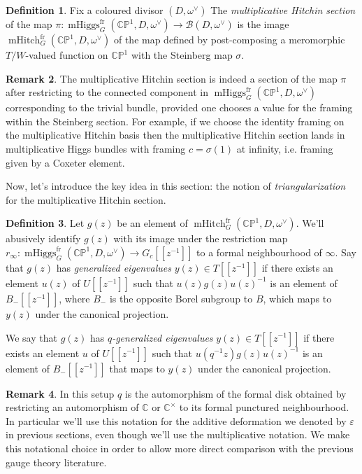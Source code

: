 \documentclass[11pt, oneside, reqno]{amsart}
\theoremstyle{definition} \newtheorem{definition}{Definition}[section]
\theoremstyle{definition} \newtheorem{remark}[definition]{Remark}
\theoremstyle{definition} \newtheorem{remarks}[definition]{Remarks}
\theoremstyle{definition} \newtheorem{question}[definition]{Question}
\theoremstyle{definition} \newtheorem*{note}{Note}
\theoremstyle{definition} \newtheorem{example}[definition]{Example}
\theoremstyle{definition} \newtheorem{examples}[definition]{Examples}
\newcommand{\bb}[1]{\mathbb{#1}}
\newcommand{\mc}[1]{\mathcal{#1}}
\newcommand{\CC}{\mathbb{C}}
\newcommand{\eps}{\varepsilon}
\DeclareMathOperator{\mhiggs}{mHiggs}
\DeclareMathOperator{\mhitch}{mHitch}
\newcommand{\fr}{\mathrm{fr}}
\begin{document}
\begin{definition} \label{mhitch_section_def}
Fix a coloured divisor $(D,\omega^\vee)$ The \emph{multiplicative Hitchin section} of the map $\pi \colon \mhiggs^\fr_G(\bb{CP}^1,D,\omega^\vee) \to \mc B(D,\omega^\vee)$ is the image $\mhitch^\fr_G(\bb{CP}^1, D, \omega^\vee)$ of the map defined by post-composing a meromorphic $T/W$-valued function on $\bb{CP}^1$ with the Steinberg map $\sigma$.
\end{definition}

\begin{remark}
The multiplicative Hitchin section is indeed a section of the map $\pi$ after restricting to the connected component in $\mhiggs^\fr_G(\bb{CP}^1,D,\omega^\vee)$ corresponding to the trivial bundle, provided one chooses a value for the framing within the Steinberg section.  For example, if we choose the identity framing on the multiplicative Hitchin basis then the multiplicative Hitchin section lands in multiplicative Higgs bundles with framing $c = \sigma(1)$ at infinity, i.e. framing given by a Coxeter element.
\end{remark}

Now, let's introduce the key idea in this section: the notion of \emph{triangularization} for the multiplicative Hitchin section.
\begin{definition} \label{gen_evals_def}
Let $g(z)$ be an element of $\mhitch^\fr_G(\bb{CP}^1, D, \omega^\vee)$.  We'll abusively identify $g(z)$ with its image under the restriction map $r_\infty \colon \mhiggs_G^\fr(\bb{CP}^1,D,\omega^\vee) \to G_c[[z^{-1}]]$ to a formal neighbourhood of $\infty$.  Say that $g(z)$ has \emph{generalized eigenvalues} $y(z) \in T[[z^{-1}]]$ if there exists an element $u(z)$ of $U[[z^{-1}]]$ such that $u(z)g(z)u(z)^{-1}$ is an element of $B_-[[z^{-1}]]$, where $B_-$ is the opposite Borel subgroup to $B$, which maps to $y(z)$ under the canonical projection.

We say that $g(z)$ has \emph{$q$-generalized eigenvalues} $y(z) \in T[[z^{-1}]]$ if there exists an element $u$ of $U[[z^{-1}]]$ such that $u(q^{-1}z)g(z)u(z)^{-1}$ is an element of $B_-[[z^{-1}]]$ that maps to $y(z)$ under the canonical projection. 
\end{definition}

\begin{remark}
In this setup $q$ is the automorphism of the formal disk obtained by restricting an automorphism of $\CC$ or $\CC^\times$ to its formal punctured neighbourhood.  In particular we'll use this notation for the additive deformation we denoted by $\eps$ in previous sections, even though we'll use the multiplicative notation.  We make this notational choice in order to allow more direct comparison with the previous gauge theory literature.
\end{remark}
\end{document}
